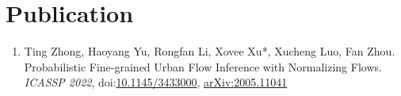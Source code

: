 \section*{Publication}


\begin{enumerate}[resume]
    \item Ting Zhong, Haoyang Yu, Rongfan Li, Xovee Xu*, Xucheng Luo, Fan Zhou. Probabilistic Fine-grained Urban Flow Inference with Normalizing Flows. \textit{ICASSP 2022}, doi:\href{papers/ICASSP_2022_FUFI.pdf}{10.1145/3433000}, \href{https://arxiv.org/abs/2005.11041}{arXiv:2005.11041}
\end{enumerate}


\begin{enumerate}[resume]
\end{enumerate}